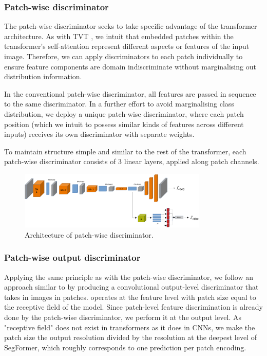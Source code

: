 \documentclass[a4paper,12pt]{report}
\begin{document}
\subsubsection{Patch-wise discriminator}
The patch-wise discriminator seeks to take specific advantage of the transformer architecture. As with TVT \cite{yang_tvt_2021}, we intuit that embedded patches within the transformer's self-attention represent different aspects or features of the input image. Therefore, we can apply discriminators to each patch individually to ensure feature components are domain indiscriminate without marginalising out distribution information.

In the conventional patch-wise discriminator, all features are passed in sequence to the same discriminator. In a further effort to avoid marginalising class distribution, we deploy a unique patch-wise discriminator, where each patch position (which we intuit to possess similar kinds of features across different inputs) receives its own discriminator with separate weights.

To maintain structure simple and similar to the rest of the transformer, each patch-wise discriminator consists of 3 linear layers, applied along patch channels.

\bigbreak
\begin{figure}[h]
    \centering
    \includegraphics[width=0.8\textwidth]{res/discriminator-diagrams/patch.pdf}
    \caption{Architecture of patch-wise discriminator.}
    \label{fig:das-discriminators-patch-wise}
\end{figure}

\subsubsection{Patch-wise output discriminator}
Applying the same principle as with the patch-wise discriminator, we follow an approach similar to \cite{hoffman_fcns_2016} by producing a convolutional output-level discriminator that takes in images in patches. \cite{hoffman_fcns_2016} operates at the feature level with patch size equal to the receptive field of the model. Since patch-level feature discrimination is already done by the patch-wise discriminator, we perform it at the output level. As "receptive field" does not exist in transformers as it does in CNNs, we make the patch size the output resolution divided by the resolution at the deepest level of SegFormer, which roughly corresponds to one prediction per patch encoding.
\end{document}
